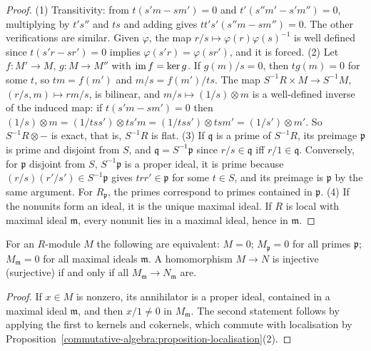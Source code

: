 \begin{proof}
(1) Transitivity: from $t(s'm - sm') = 0$ and $t'(s''m' - s'm'') = 0$, multiplying by $t's''$ and $ts$ and adding gives
$tt's'(s''m - sm'') = 0$. The other verifications are similar. Given $\varphi$, the map $r/s \mapsto \varphi(r)\varphi(s)^{-1}$ is well
defined since $t(s'r - sr') = 0$ implies $\varphi(s'r) = \varphi(sr')$, and it is forced.
(2) Let $f \colon M' \to M$, $g \colon M \to M''$ with $\operatorname{im} f = \ker g$. If $g(m)/s = 0$, then $tg(m) = 0$ for some $t$, so
$tm = f(m')$ and $m/s = f(m')/ts$. The map $S^{-1}R \times M \to S^{-1}M$, $(r/s, m) \mapsto rm/s$, is bilinear, and
$m/s \mapsto (1/s) \otimes m$ is a well-defined inverse of the induced map: if $t(s'm - sm') = 0$ then
$(1/s) \otimes m = (1/tss')\otimes ts'm = (1/tss') \otimes tsm' = (1/s') \otimes m'$. So $S^{-1}R \otimes -$ is exact, that is, $S^{-1}R$
is flat.
(3) If $\mathfrak{q}$ is a prime of $S^{-1}R$, its preimage $\mathfrak{p}$ is prime and disjoint from $S$, and $\mathfrak{q} = S^{-1}\mathfrak{p}$
since $r/s \in \mathfrak{q}$ iff $r/1 \in \mathfrak{q}$. Conversely, for $\mathfrak{p}$ disjoint from $S$, $S^{-1}\mathfrak{p}$ is a proper ideal,
it is prime because $(r/s)(r'/s') \in S^{-1}\mathfrak{p}$ gives $trr' \in \mathfrak{p}$ for some $t \in S$, and its preimage is $\mathfrak{p}$ by
the same argument. For $R_\mathfrak{p}$, the primes correspond to primes contained in $\mathfrak{p}$.
(4) If the nonunits form an ideal, it is the unique maximal ideal. If $R$ is local with maximal ideal $\mathfrak{m}$, every
nonunit lies in a maximal ideal, hence in $\mathfrak{m}$.
\end{proof}

\begin{proposition}\label{commutative-algebra:proposition-local-global}
For an $R$-module $M$ the following are equivalent: $M = 0$; $M_\mathfrak{p} = 0$ for all primes $\mathfrak{p}$; $M_\mathfrak{m} = 0$ for all
maximal ideals $\mathfrak{m}$. A homomorphism $M \to N$ is injective (surjective) if and only if all $M_\mathfrak{m} \to N_\mathfrak{m}$
are.
\end{proposition}

\begin{proof}
If $x \in M$ is nonzero, its annihilator is a proper ideal, contained in a maximal ideal $\mathfrak{m}$, and then
$x/1 \neq 0$ in $M_\mathfrak{m}$. The second statement follows by applying the first to kernels and cokernels, which commute
with localisation by Proposition~\ref{commutative-algebra:proposition-localisation}(2).
\end{proof}

